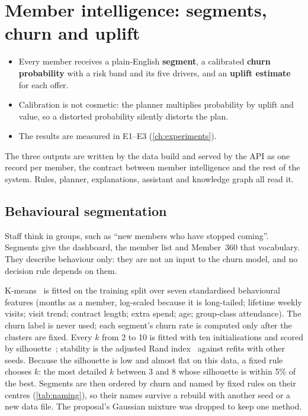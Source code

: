 \chapter{Member intelligence: segments, churn and uplift}
\label{ch:member}

\begin{inbrief}
\begin{itemize}
  \item Every member receives a plain-English \textbf{segment}, a calibrated \textbf{churn probability} with a risk band and its five drivers, and an \textbf{uplift estimate} for each offer.
  \item Calibration is not cosmetic: the planner multiplies probability by uplift and value, so a distorted probability silently distorts the plan.
  \item The results are measured in E1--E3 (\cref{ch:experiments}).
\end{itemize}
\end{inbrief}

The three outputs are written by the data build and served by the API as one record per member, the contract between member intelligence and the rest of the system. Rules, planner, explanations, assistant and knowledge graph all read it.

\section{Behavioural segmentation}
\label{sec:segments}

Staff think in groups, such as \enquote{new members who have stopped coming}. Segments give the dashboard, the member list and Member~360 that vocabulary. They describe behaviour only: they are not an input to the churn model, and no decision rule depends on them.

K-means~\cite{arthur2007kmeanspp} is fitted on the training split over seven standardised behavioural features (months as a member, log-scaled because it is long-tailed; lifetime weekly visits; visit trend; contract length; extra spend; age; group-class attendance). The churn label is never used; each segment's churn rate is computed only after the clusters are fixed. Every $k$ from 2 to 10 is fitted with ten initialisations and scored by silhouette~\cite{rousseeuw1987silhouettes}; stability is the adjusted Rand index~\cite{hubert1985partitions} against refits with other seeds. Because the silhouette is low and almost flat on this data, a fixed rule chooses $k$: the most detailed $k$ between 3 and 8 whose silhouette is within 5\% of the best. Segments are then ordered by churn and named by fixed rules on their centres (\cref{tab:naming}), so their names survive a rebuild with another seed or a new data file. The proposal's Gaussian mixture was dropped to keep one method.

